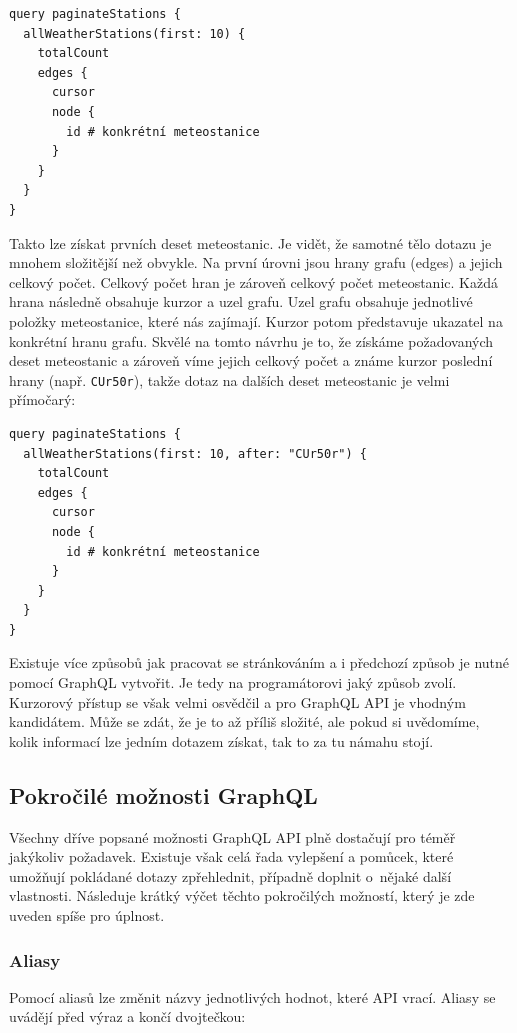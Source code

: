 \begin{verbatim}
query paginateStations {
  allWeatherStations(first: 10) {
    totalCount
    edges {
      cursor
      node {
        id # konkrétní meteostanice
      }
    }
  }
}
\end{verbatim}

Takto lze získat prvních deset meteostanic. Je vidět, že samotné tělo dotazu je mnohem složitější než obvykle. Na první úrovni jsou hrany grafu (edges) a jejich celkový počet. Celkový počet hran je zároveň celkový počet meteostanic. Každá hrana následně obsahuje kurzor a uzel grafu. Uzel grafu obsahuje jednotlivé položky meteostanice, které nás zajímají. Kurzor potom představuje ukazatel na konkrétní hranu grafu. Skvělé na tomto návrhu je to, že získáme požadovaných deset meteostanic a zároveň víme jejich celkový počet a známe kurzor poslední hrany (např. \texttt{CUr50r}), takže dotaz na dalších deset meteostanic je velmi přímočarý:

\begin{verbatim}
query paginateStations {
  allWeatherStations(first: 10, after: "CUr50r") {
    totalCount
    edges {
      cursor
      node {
        id # konkrétní meteostanice
      }
    }
  }
}
\end{verbatim}

Existuje více způsobů jak pracovat se stránkováním a i předchozí způsob je nutné pomocí GraphQL vytvořit. Je tedy na programátorovi jaký způsob zvolí. Kurzorový přístup se však velmi osvědčil a pro GraphQL API je vhod\-ným kandidátem. Může se zdát, že je to až příliš složité, ale pokud si uvě\-do\-mí\-me, kolik informací lze jedním dotazem získat, tak to za tu námahu stojí.

\subsection{Pokročilé možnosti GraphQL}
Všechny dříve popsané možnosti GraphQL API plně dostačují pro téměř jakýkoliv požadavek. Existuje však celá řada vylepšení a pomůcek, které umožňují pokládané dotazy zpřehlednit, případně doplnit o~nějaké další vlast\-nosti. Následuje krátký výčet těchto pokročilých možností, který je zde uveden spíše pro úplnost.

\subsubsection{Aliasy}
Pomocí aliasů lze změnit názvy jednotlivých hodnot, které API vrací. Aliasy se uvádějí před výraz a končí dvojtečkou:

